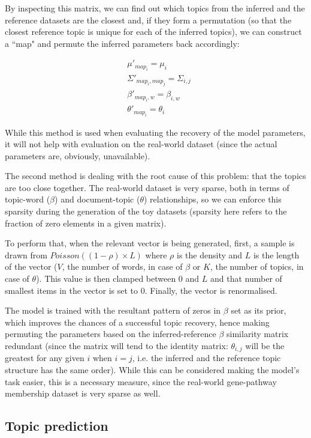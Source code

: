 \documentclass[12pt,a4paper,twoside,openright]{report}
\begin{document}
By inspecting this matrix, we can find out which topics from the inferred and the reference datasets are the closest and, if they form a permutation (so that the closest reference topic is unique for each of the inferred topics), we can construct a ``map" and permute the inferred parameters back accordingly:

\begin{align*}
&\mu'_{map_i} = \mu_i \\
&\Sigma'_{map_i, map_j} = \Sigma_{i, j} \\
&\beta'_{map_i, w} = \beta_{i, w} \\
&\theta'_{map_i} = \theta_i
\end{align*}

While this method is used when evaluating the recovery of the model parameters, it will not help with evaluation on the real-world dataset (since the actual parameters are, obviously, unavailable).

The second method is dealing with the root cause of this problem: that the topics are too close together. The real-world dataset is very sparse, both in terms of topic-word ($\beta$) and document-topic ($\theta$) relationships, so we can enforce this sparsity during the generation of the toy datasets (sparsity here refers to the fraction of zero elements in a given matrix).

To perform that, when the relevant vector is being generated, first, a sample is drawn from $\mathit{Poisson}((1-\rho) \times L)$ where $\rho$ is the density and $L$ is the length of the vector ($V$, the number of words, in case of $\beta$ or $K$, the number of topics, in case of $\theta$). This value is then clamped between 0 and $L$ and that number of smallest items in the vector is set to 0. Finally, the vector is renormalised.

The model is trained with the resultant pattern of zeros in $\beta$ set as its prior, which improves the chances of a successful topic recovery, hence making permuting the parameters based on the inferred-reference $\beta$ similarity matrix redundant (since the matrix will tend to the identity matrix: $\theta_{i, j}$ will be the greatest for any given $i$ when $i = j$, i.e. the inferred and the reference topic structure has the same order). While this can be considered making the model's task easier, this is a necessary measure, since the real-world gene-pathway membership dataset is very sparse as well.

\subsection{Topic prediction}
\end{document}
